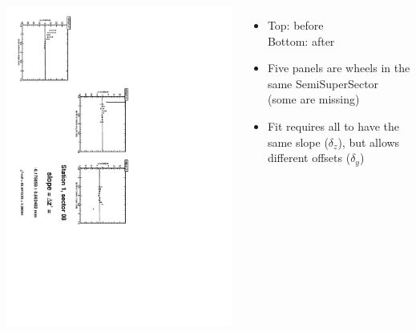 \documentclass[compress]{beamer}
\begin{document}
\begin{frame}
\begin{columns}
\vfill
\includegraphics[height=\linewidth, angle=90]{zfits_after/zfit_1_08.pdf}
\begin{itemize}
\item Top: before \\ Bottom: after
\item Five panels are wheels in the same SemiSuperSector (some are missing)
\item Fit requires all to have the same slope ($\delta_z$), but allows different offsets ($\delta_y$)
\end{itemize}
\end{columns}
\end{frame}
\end{document}
